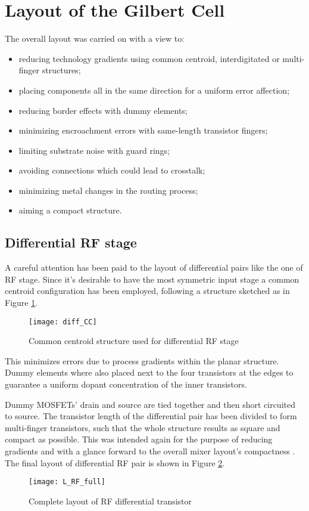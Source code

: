 \section{Layout of the Gilbert Cell}
The overall layout was carried on with a view to:
\begin{itemize}
	\item reducing technology gradients using common centroid, interdigitated or multi-finger structures;
	\item placing components all in the same direction for a uniform error affection;
	\item reducing border effects with dummy elements;
	\item minimizing encroachment errors with same-length transistor fingers;
 	\item limiting substrate noise with guard rings;
	\item avoiding connections which could lead to crosstalk;
	\item minimizing metal changes in the routing process;
	\item aiming a compact structure.
\end{itemize}
\subsection{Differential RF stage}
A careful attention has been paid to the layout of differential pairs like the one of RF stage. Since it's desirable to have the most symmetric input stage a common centroid configuration has been employed, following a structure sketched as in Figure \ref{fig:diff_CC}. 

\begin{figure}[H]
	\centering
	\texttt{[image: diff\_CC]}
	\caption{Common centroid structure used for differential RF stage}
	\label{fig:diff_CC}
\end{figure}
This minimizes errors due to process gradients within the planar structure. Dummy elements where also placed next to the four transistors at the edges to guarantee a uniform dopant concentration of the inner transistors.

Dummy MOSFETs' drain and source are tied together and then short circuited to source.
The transistor length of the differential pair has been divided to form multi-finger  transistors, such that the whole structure results as square and compact as possible. This was intended again for the purpose of reducing gradients and with a glance forward to the overall mixer layout's compactness . The final layout of differential RF pair is shown in Figure \ref{L_RF_full}.
\begin{figure}[H]
	\centering
	\texttt{[image: L\_RF\_full]}
	\caption{Complete layout of RF differential transistor}
	\label{L_RF_full}
\end{figure}

